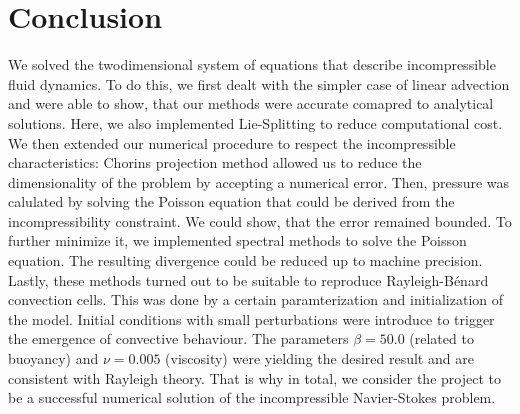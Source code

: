 \chapter{Conclusion}

We solved the twodimensional system of equations that describe incompressible fluid dynamics.
To do this, we first dealt with the simpler case of linear advection and were able to show, that our methods were accurate comapred to analytical solutions.
Here, we also implemented Lie-Splitting to reduce computational cost.
We then extended our numerical procedure to respect the incompressible characteristics:
Chorins projection method allowed us to reduce the dimensionality of the problem by accepting a numerical error.
Then, pressure was calulated by solving the Poisson equation that could be derived from the incompressibility constraint.
We could show, that the error remained bounded. 
To further minimize it, we implemented spectral methods to solve the Poisson equation.
The resulting divergence could be reduced up to machine precision.
Lastly, these methods turned out to be suitable to reproduce Rayleigh-B\'{e}nard convection cells.
This was done by a certain paramterization and initialization of the model. 
Initial conditions with small perturbations were introduce to trigger the emergence of convective behaviour.
The parameters $\beta= 50.0$ (related to buoyancy) and $\nu = 0.005$ (viscosity) were yielding the desired result and are consistent with Rayleigh theory.
That is why in total, we consider the project to be a successful numerical solution of the incompressible Navier-Stokes problem.


